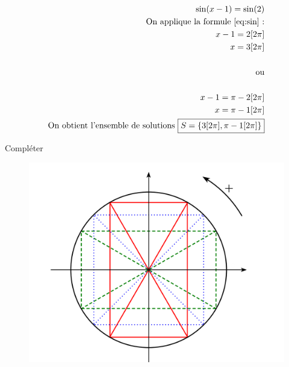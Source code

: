 \documentclass{article}
\begin{document}
\begin{exercice}[\'Equations]
\begin{align*}
\sin(x-1) = \sin(2)\\
\text{On applique la formule \ref{eq:sin} :}\\
x-1 = 2 [2\pi] \\
x = 3 [2\pi] \\\\
\text{ou}\\\\
  x-1 = \pi - 2 [2\pi]\\
  x = \pi -1 [2\pi] \\
  \text{On obtient l'ensemble de solutions } \boxed{S = \left\{ 3 [2\pi], \pi - 1 [2\pi] \right\}}
\end{align*}





\end{exercice}	


\newpage
\begin{exercice}
	Compléter
	\begin{center}
	\begin{figure}[h!]
		\includegraphics[scale=0.8]{../cercle_trigo}
	\end{figure}
	\end{center}
\end{exercice}
	
\end{document}
